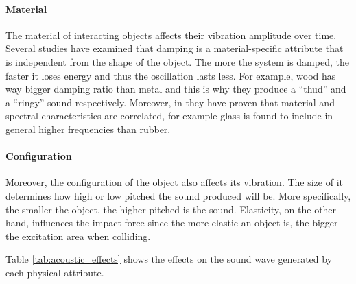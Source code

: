 \paragraph{Material\\}
The material of interacting objects affects their vibration amplitude over time. Several studies \cite{wildes1988recovering, giordano2006material}have examined that damping is a material-specific attribute that is independent from the shape of the object. The more the system is damped, the faster it loses energy and thus the oscillation lasts less. For example, wood has way bigger damping ratio than metal and this is why they produce a ``thud'' and a ``ringy'' sound respectively. Moreover, in \cite{klatzky2000perception} they have proven that material and spectral characteristics are correlated, for example glass is found to include in general higher frequencies than rubber. 

\paragraph{Configuration\\}
Moreover, the configuration of the object also affects its vibration. The size of it determines how high or low pitched the sound produced will be. More specifically, the smaller the object, the higher pitched is the sound. Elasticity, on the other hand, influences the impact force since the more elastic an object is, the bigger the excitation area when colliding.  

Table \ref{tab:acoustic_effects} shows the effects on the sound wave generated by each physical attribute. 

